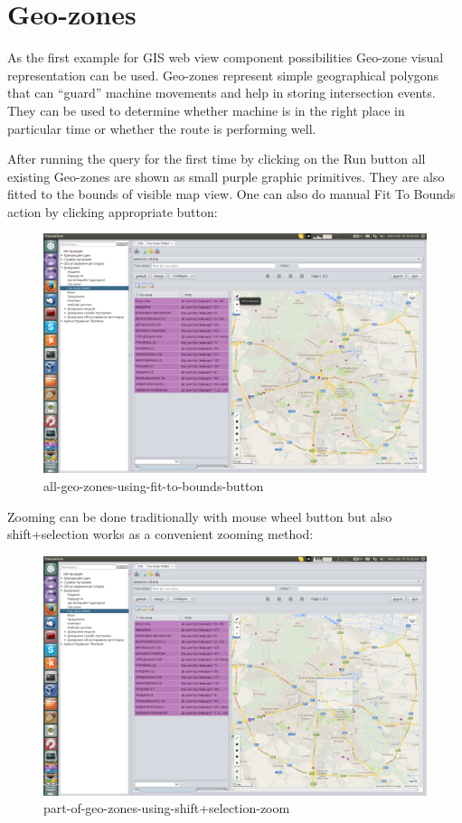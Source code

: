 \section{Geo-zones}
As the first example for GIS web view component possibilities Geo-zone visual representation can be used.
Geo-zones represent simple geographical polygons that can ``guard'' machine movements and help in storing
intersection events. They can be used to determine whether machine is in the right place in particular time
or whether the route is performing well.

After running the query for the first time by clicking on the Run button all existing Geo-zones are shown 
as small purple graphic primitives. They are also fitted to the bounds of visible map view. One can also 
do manual Fit To Bounds action by clicking appropriate button:
\begin{figure}[!htp]
\centering
\includegraphics[width=16cm]{chapters/01-geozones/images/01-all-geo-zones-using-fit-to-bounds-button.png}
\caption{all-geo-zones-using-fit-to-bounds-button}\label{fig:01}
\end{figure}
Zooming can be done traditionally with mouse wheel button but also shift+selection works as a convenient 
zooming method:
\begin{figure}[!htp]
\centering
\includegraphics[width=16cm]{chapters/01-geozones/images/02-part-of-geo-zones-using-shift+selection-zoom.png}
\caption{part-of-geo-zones-using-shift+selection-zoom}\label{fig:02}
\end{figure}
